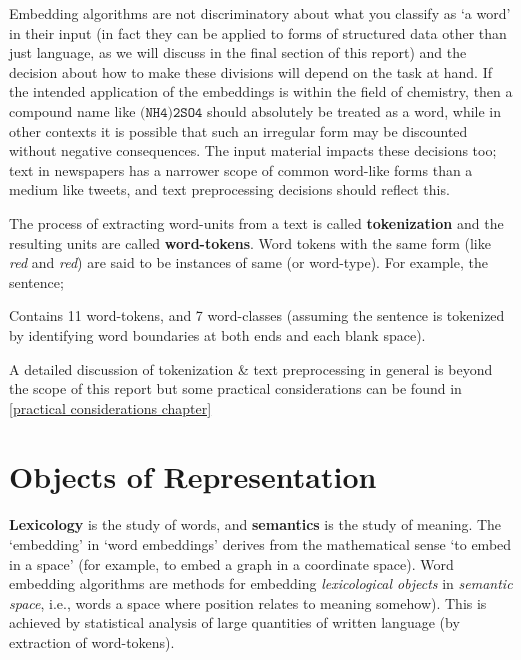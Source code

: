 Embedding algorithms are not discriminatory about what you classify as `a word' in their input (in fact they can be applied to forms of structured data other than just language, as we will discuss in the final section of this report) and the decision about how to make these divisions will depend on the task at hand. If the intended application of the embeddings is within the field of chemistry, then a compound name like $\texttt{(NH4)2SO4}$ should absolutely be treated as a word, while in other contexts it is possible that such an irregular form may be discounted without negative consequences. The input material impacts these decisions too; text in newspapers has a narrower scope of common word-like forms than a medium like tweets, and text preprocessing decisions should reflect this.

The process of extracting word-units from a text is called \textbf{tokenization} and the resulting units are called \textbf{word-tokens}. Word tokens with the same form (like \emph{red} and \emph{red}) are said to be instances of same  (or word-type). For example, the sentence;


Contains 11 word-tokens, and 7 word-classes (assuming the sentence is tokenized by identifying word boundaries at both ends and each blank space).

A detailed discussion of tokenization \& text preprocessing in general is beyond the scope of this report but some practical considerations can be found in \autoref{practical considerations chapter}

\section{Objects of Representation}
\textbf{Lexicology} is the study of words, and \textbf{semantics} is the study of meaning. The `embedding' in `word embeddings' derives from the mathematical sense `to embed in a space' (for example, to embed a graph in a coordinate space). Word embedding algorithms are methods for embedding \emph{lexicological objects} in \emph{semantic space}, i.e., words a space where position relates to meaning somehow). This is achieved by statistical analysis of large quantities of written language (by extraction of word-tokens).

